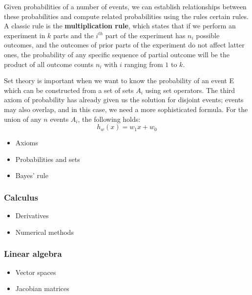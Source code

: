 Given probabilities of a number of events, we can establish
relationships between these probabilities and compute related
probabilities using the rules certain rules. A classic rule is the
\textbf{multiplication rule}, which states that if we perform an
experiment in $k$ parts and the $i^{th}$ part of the experiment has
$n_i$ possible outcomes, and the outcomes of prior parts of the
experiment do not affect latter ones, the probability of any specific
sequence of partial outcome will be the product of all outcome counts
$n_i$ with $i$ ranging from $1$ to $k$.

Set theory is important when we want to know the probability of an
event E which can be constructed from a set of sets $A_i$ using set
operators. The third axiom of probability has already given us the
solution for disjoint events; events may also overlap, and in this
case, we need a more sophisticated formula. For the union of any $n$
events $A_i$, the following holds:
\begin{equation}
  h_w(x) = w_1x + w_0
\end{equation}


\begin{itemize}
  \item Axioms
  \item Probabilities and sets
  \item Bayes' rule
\end{itemize}

\subsubsection{Calculus}
\label{sec:calculus}
\begin{itemize}
  \item Derivatives
  \item Numerical methods
\end{itemize}

\subsubsection{Linear algebra}
\label{sec:linearalgebra}
\begin{itemize}
  \item Vector spaces
  \item Jacobian matrices
\end{itemize}


